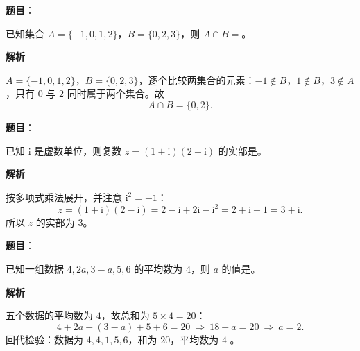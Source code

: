 

\begin{answer}

\textbf{题目}：

已知集合 $A=\{-1,0,1,2\}$，$B=\{0,2,3\}$，则 $A\cap B=$\gkblank{}。

\textbf{解析}

$A=\{-1,0,1,2\}$，$B=\{0,2,3\}$，逐个比较两集合的元素：$-1\notin B$，$1\notin B$，$3\notin A$，只有 $0$ 与 $2$ 同时属于两个集合。故
\nopagebreak[4]
\[A\cap B=\{0,2\}.\]


\end{answer}
\begin{answer}

\textbf{题目}：

已知 $\mathrm i$ 是虚数单位，则复数 $z=(1+\mathrm i)(2-\mathrm i)$ 的实部是\gkblank{}。

\textbf{解析}

按多项式乘法展开，并注意 $\mathrm i^2=-1$：
\nopagebreak[4]
\[z=(1+\mathrm i)(2-\mathrm i)=2-\mathrm i+2\mathrm i-\mathrm i^2=2+\mathrm i+1=3+\mathrm i .\]
所以 $z$ 的实部为 $3$。


\end{answer}
\begin{answer}

\textbf{题目}：

已知一组数据 $4,2a,3-a,5,6$ 的平均数为 $4$，则 $a$ 的值是\gkblank{}。

\textbf{解析}

五个数据的平均数为 $4$，故总和为 $5\times4=20$：
\nopagebreak[4]
\[4+2a+(3-a)+5+6=20\ \Longrightarrow\ 18+a=20\ \Longrightarrow\ a=2 .\]
回代检验：数据为 $4,4,1,5,6$，和为 $20$，平均数为 $4$ 。


\end{answer}
